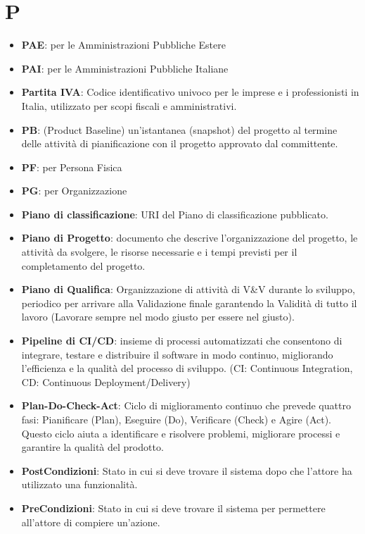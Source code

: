 \documentclass[a4paper,12pt]{article}
\begin{document}
\section{P}
\begin{itemize}
    \item \textbf{PAE}: per le Amministrazioni Pubbliche Estere
    \item \textbf{PAI}: per le Amministrazioni Pubbliche Italiane
    \item \textbf{Partita IVA}: Codice identificativo univoco per le imprese e i professionisti in Italia, utilizzato per scopi fiscali e amministrativi.
    \item \textbf{PB}: (Product Baseline) un'istantanea (snapshot) del progetto al termine delle attività di pianificazione con il progetto approvato dal committente.
    \item \textbf{PF}: per Persona Fisica
    \item \textbf{PG}: per Organizzazione
    \item \textbf{Piano di classificazione}: URI del Piano di classificazione pubblicato.
    \item \textbf{Piano di Progetto}: documento che descrive l'organizzazione del progetto, le attività da svolgere, le risorse necessarie e i tempi previsti per il completamento del progetto. 
    \item \textbf{Piano di Qualifica}: Organizzazione di attività di V\&V durante lo sviluppo, periodico per arrivare alla Validazione finale garantendo la Validità di tutto il lavoro (Lavorare sempre nel modo giusto per essere nel giusto).
    \item \textbf{Pipeline di CI/CD}: insieme di processi automatizzati che consentono di integrare, testare e distribuire il software in modo continuo, migliorando l'efficienza e la qualità del processo di sviluppo. (CI: Continuous Integration, CD: Continuous Deployment/Delivery)
    \item \textbf{Plan-Do-Check-Act}: Ciclo di miglioramento continuo che prevede quattro fasi: Pianificare (Plan), Eseguire (Do), Verificare (Check) e Agire (Act). Questo ciclo aiuta a identificare e risolvere problemi, migliorare processi e garantire la qualità del prodotto.
    \item \textbf{PostCondizioni}: Stato in cui si deve trovare il sistema dopo che l'attore ha utilizzato una funzionalità.
    \item \textbf{PreCondizioni}: Stato in cui si deve trovare il sistema per permettere all'attore di compiere un'azione.

\end{itemize}
\end{document}
